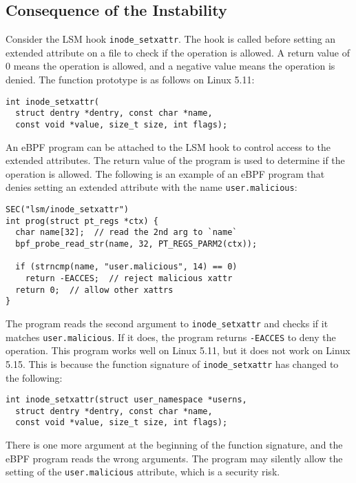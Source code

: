 \subsection{Consequence of the Instability}
Consider the LSM hook \texttt{inode\_setxattr}.
The hook is called before setting an extended attribute on a file to check if the operation is allowed.
A return value of 0 means the operation is allowed, and a negative value means the operation is denied.
The function prototype is as follows on Linux 5.11:

\begin{verbatim}
int inode_setxattr(
  struct dentry *dentry, const char *name, 
  const void *value, size_t size, int flags);
\end{verbatim}

\noindent
An eBPF program can be attached to the LSM hook to control access to the extended attributes.
The return value of the program is used to determine if the operation is allowed.
The following is an example of an eBPF program that denies setting an extended attribute with the name \texttt{user.malicious}:


\begin{verbatim}
SEC("lsm/inode_setxattr")
int prog(struct pt_regs *ctx) {
  char name[32];  // read the 2nd arg to `name`
  bpf_probe_read_str(name, 32, PT_REGS_PARM2(ctx));

  if (strncmp(name, "user.malicious", 14) == 0)
    return -EACCES;  // reject malicious xattr
  return 0;  // allow other xattrs
}
\end{verbatim}

\noindent
The program reads the second argument to \texttt{inode\_setxattr} and checks if it matches \texttt{user.malicious}.
If it does, the program returns \texttt{-EACCES} to deny the operation.
This program works well on Linux 5.11, but it does not work on Linux 5.15.
This is because the function signature of \texttt{inode\_setxattr} has changed to the following:

\begin{verbatim}
int inode_setxattr(struct user_namespace *userns, 
  struct dentry *dentry, const char *name, 
  const void *value, size_t size, int flags);
\end{verbatim}

\noindent
There is one more argument at the beginning of the function signature, and the eBPF program reads the wrong arguments.
The program may silently allow the setting of the \texttt{user.malicious} attribute, which is a security risk.



